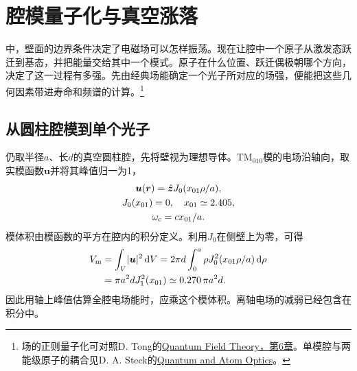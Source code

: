 \chapter{腔模量子化与真空涨落}
\label{chap:cavity qed}

中，壁面的边界条件决定了电磁场可以怎样振荡。现在让腔中一个原子从激发态跃迁到基态，并把能量交给其中一个模式。原子在什么位置、跃迁偶极朝哪个方向，决定了这一过程有多强。先由经典场能确定一个光子所对应的场强，便能把这些几何因素带进寿命和频谱的计算。\footnote{场的正则量子化可对照D. Tong的\href{https://www.damtp.cam.ac.uk/user/tong/qft/qfthtml/S6.html}{Quantum Field Theory，第6章}。单模腔与两能级原子的耦合见D. A. Steck的\href{https://atomoptics-nas.uoregon.edu/~dsteck/teaching/quantum-optics/}{Quantum and Atom Optics}。}

\section{从圆柱腔模到单个光子}
\label{sec:single cavity mode}

仍取半径$a$、长$d$的真空圆柱腔，先将壁视为理想导体。TM$_{010}$模的电场沿轴向，取实模函数$\bm u$并将其峰值归一为1，
\begin{gather*}
    \bm u(\bm r) = \mathop{}\!\hat{\bm{z}} J_0(x_{01}\rho/a),\\
    J_0(x_{01}) = 0,\quad x_{01} \simeq 2.405,\\
    \omega_{\mathrm{c}} = cx_{01}/a .
\end{gather*}
模体积由模函数的平方在腔内的积分定义。利用$J_0$在侧壁上为零，可得
\begin{equation}
    \begin{aligned}
        V_{\mathrm m} &= \int_V\lvert\bm u\rvert^2\mathop{}\!\mathrm{d} V
          = 2\pi d\int_0^a \rho J_0^2(x_{01}\rho/a)\mathop{}\!\mathrm{d}\rho\\
        &= \pi a^2d J_1^2(x_{01}) \simeq 0.270\,\pi a^2d .
    \end{aligned}
    \label{eqn:tm010 mode volume}
\end{equation}
因此用轴上峰值估算全腔电场能时，应乘这个模体积。离轴电场的减弱已经包含在积分中。

